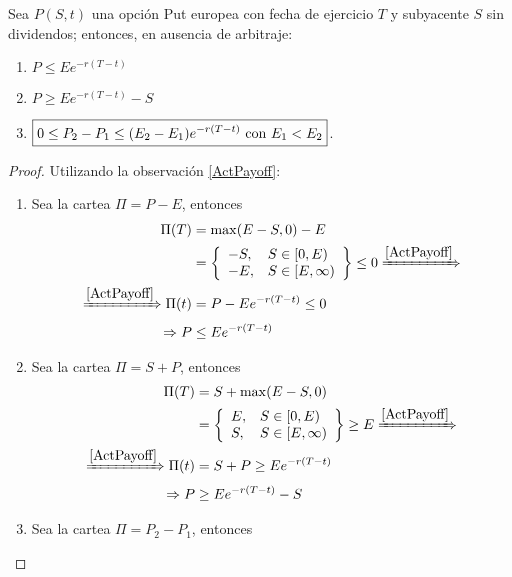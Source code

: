 \begin{proposition}
    Sea $P(S,t)$ una opción Put europea con fecha de ejercicio $T$ y subyacente $S$ sin dividendos; entonces, en ausencia de arbitraje:
    \begin{enumerate}
        \item $\boxed{P \leq Ee^{-r(T-t)}}$
        \item $\boxed{P \geq Ee^{-r(T-t)} - S}$
        \item $\boxed{0 \leq P_2 - P_1 \leq (E_2-E_1)e^{-r(T-t)}$ con $E_1<E_2}$.
    \end{enumerate}
\end{proposition}
\begin{proof}
    Utilizando la observación \ref{ActPayoff}:
    \begin{enumerate}
        \item Sea la cartea $\Pi = P - E$, entonces
        \begin{align*}
            \Pi(T) &= \max(E - S,0) - E \\
            &= \left\{
            \begin{array}{ll}
              -S,       & S\in [0,E) \\
              -E,        & S\in [E,\infty)
            \end{array}
            \right\} \leq 0 \xRightarrow{\ref{ActPayoff}}\\
            \xRightarrow{\ref{ActPayoff}} \Pi(t) &= P - Ee^{-r(T-t)} \leq 0 \\
            \Rightarrow P &\leq  Ee^{-r(T-t)}
        \end{align*}
        \item Sea la cartea $\Pi = S + P$, entonces
        \begin{align*}
            \Pi(T) &= S +\max(E - S,0) \\
            &= \left\{
            \begin{array}{ll}
              E,       & S\in [0,E) \\
              S,        & S\in [E,\infty)
            \end{array}
            \right\} \geq E \xRightarrow{\ref{ActPayoff}}\\
            \xRightarrow{\ref{ActPayoff}} \Pi(t) &= S + P \geq Ee^{-r(T-t)} \\
            \Rightarrow P &\geq  Ee^{-r(T-t)} - S
        \end{align*}
        \item Sea la cartea $\Pi = P_2 - P_1$, entonces

\end{enumerate}
\end{proof}
